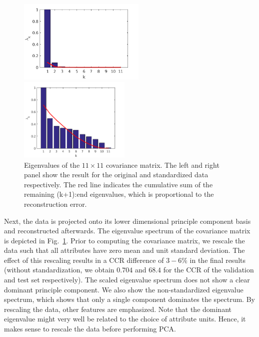 \documentclass[pdftex,11pt,a4paper]{article}
\begin{document}
\begin{figure}[htb]
\begin{minipage}{0.5\textwidth}
\includegraphics[height=4cm]{figs/eigenvalues_non-standardized.png}
\end{minipage}%
\begin{minipage}{0.5\textwidth}
\includegraphics[height=4cm]{figs/eigenvalues.png}
\end{minipage}%
\caption{Eigenvalues of the $11\times11$ covariance matrix. The left and right panel show the result for the original and standardized data respectively. The red line indicates the cumulative sum of the remaining (k+1):end eigenvalues, which is proportional to the reconstruction error. \label{fig:eigenvalues}}
\end{figure}

Next, the data is projected onto its lower dimensional principle component basis and reconstructed afterwards. The eigenvalue spectrum of the covariance matrix is depicted in Fig.~\ref{fig:eigenvalues}. Prior to computing the covariance matrix, we rescale the data such that all attributes have zero mean and unit standard deviation. The effect of this rescaling results in a CCR difference of $3-6 \%$ in the final results (without standardization, we obtain $0.704$ and $68.4$ for the CCR of the validation and test set respectively). The scaled eigenvalue spectrum does not show a clear dominant principle component. We also show the non-standardized eigenvalue spectrum, which shows that only a single component dominates the spectrum. By rescaling the data, other features are emphasized. Note that the dominant eigenvalue might very well be related to the choice of attribute units. Hence, it makes sense to rescale the data before performing PCA.
\end{document}
